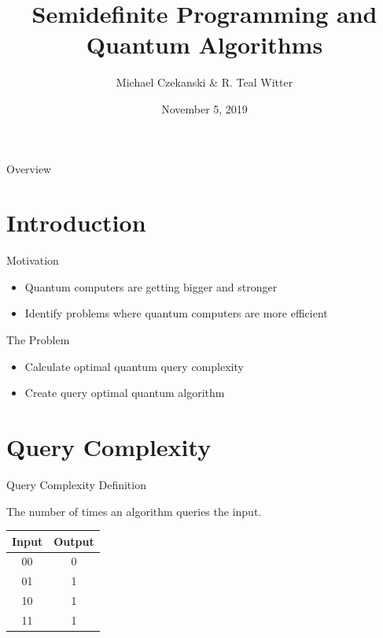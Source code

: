 \documentclass[12pt]{beamer}
\title{Semidefinite Programming and Quantum Algorithms}
\author{Michael Czekanski \& R. Teal Witter}
\institute{Middlebury College}
\date{November 5, 2019}
\begin{document}
\graphicspath{{./../figures/}}

\frame{\titlepage}

\begin{frame}{Overview}
\setcounter{tocdepth}{1}
\tableofcontents
\end{frame}

\section{Introduction}
\begin{frame}{Motivation}
    \begin{itemize}
        \item Quantum computers are getting bigger and stronger
        \item Identify problems where quantum computers are
        more efficient
    \end{itemize}
\end{frame}

\begin{frame}{The Problem}
    \begin{itemize}
        \item Calculate optimal quantum query complexity
        \item Create query optimal quantum algorithm
    \end{itemize}
\end{frame}




\section{Query Complexity}
\begin{frame}{Query Complexity Definition}
\begin{center}
The number of times an algorithm queries the input.
\end{center}
\begin{table}[]
\begin{tabular}{cc}
\hline
\textbf{Input} & \textbf{Output} \\ \hline
00             & 0               \\
01             & 1               \\
10             & 1               \\
11             & 1               \\ \hline
\end{tabular}
\end{table}
\end{frame}
\end{document}
